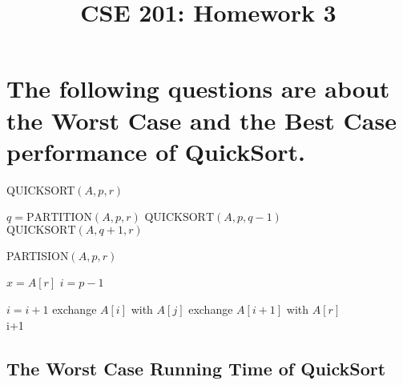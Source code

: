\documentclass[a4paper]{article}
\title{CSE 201: Homework 3}
\begin{document}
\maketitle
\section{The following questions are about the Worst Case and the Best Case performance of QuickSort. }
\begin{algorithm}
  \caption{QUICKSORT$(A,p,r)$}\label{alg:cap1}
  \begin{algorithmic}[1] 
  \State $q =\text{PARTITION}(A,p,r) $
  \State $\text{QUICKSORT}(A,p, q-1)$
  \State $\text{QUICKSORT}(A,q+1,r)$
  \EndIf
  \end{algorithmic}
  \end{algorithm}

  \begin{algorithm}
    \caption{PARTISION$(A,p,r)$}\label{alg:cap2}
    \begin{algorithmic}[1] 
    \State $x=A[r]$
    \State $i=p-1$

    \State $i=i+1$
    \State exchange $A[i]$ with $A[j]$
    \EndIf
    \State exchange $A[i+1]$ with $A[r]$
    \EndFor
    \\
    \Return i+1
    \end{algorithmic}
    \end{algorithm}
\subsection{The Worst Case Running Time of QuickSort }
\end{document}
